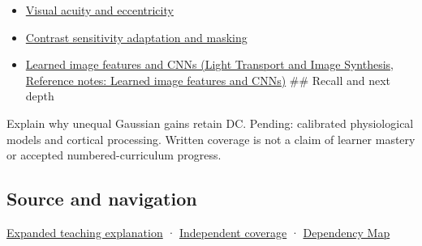 \hypertarget{appendix-7281c15ac44a-used-by}{}

\begin{itemize}
\item
  \hyperref[appendix-b491fc48c54b]{Visual acuity and eccentricity}
\item
  \hyperref[appendix-b3aa9e8e01ad]{Contrast sensitivity adaptation and masking}
\item
  \href{../04-Light-Transport-and-Image-Synthesis/main.pdf\#nameddest=appendix-47c51ea026fb}{Learned image features and CNNs (Light Transport and Image Synthesis, Reference notes: Learned image features and CNNs)} \#\# Recall and next depth
\end{itemize}

Explain why unequal Gaussian gains retain DC. Pending: calibrated physiological models and cortical processing. Written coverage is not a claim of learner mastery or accepted numbered-curriculum progress.

\subsection{Source and navigation}\label{appendix-7281c15ac44a-source-and-navigation}

\hypertarget{appendix-7281c15ac44a-source-and-navigation}{}

\hyperref[04-visual-computing-ii-ch042-the-eye-is-an-optical-instrument-with-neural-processing-inside-it]{Expanded teaching explanation} · \hyperref[appendix-fd090d982a15-xr01---independent-seeing-and-representation-source]{Independent coverage} · \hyperref[appendix-4ad47bdd269a]{Dependency Map}
